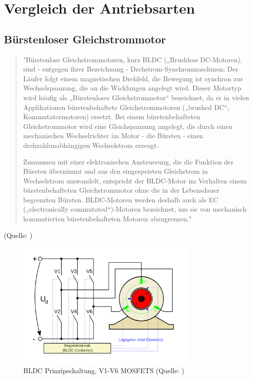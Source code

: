 \renewcommand{\autoren}{Severin Schendel	}
\newpage
\section{Vergleich der Antriebsarten}
\subsection{Bürstenloser Gleichstrommotor}

\begin{quote}
"Bürstenlose Gleichstrommotoren, kurz BLDC („Brushless DC-Motoren), sind -  entgegen ihrer Bezeichnung - Drehstrom-Synchronmaschinen: Der Läufer folgt einem magnetischen Drehfeld, die Bewegung ist synchron zur Wechselspannung, die an die Wicklungen angelegt wird. Dieser Motortyp wird häufig als „Bürstenloser Gleichstrommotor“ bezeichnet, da er in vielen Applikationen bürstenbehaftete Gleichstrommotoren („brushed DC“, Kommutatormotoren) ersetzt. Bei einem bürstenbehafteten Gleichstrommotor wird eine Gleichspannung angelegt, die durch einen mechanischen Wechselrichter im Motor - die Bürsten - einen drehzahlunabhängigen Wechselstrom erzeugt.

Zusammen mit einer elektronischen Ansteuerung, die die Funktion der Bürsten übernimmt und aus den eingespeisten Gleichstrom in Wechselstrom umwandelt, entspricht der BLDC-Motor im Verhalten einem bürstenbehafteten Gleichstrommotor ohne die in der Lebensdauer begrenzten Bürsten.  BLDC-Motoren werden deshalb auch als EC („electronically commutated“)-Motoren bezeichnet, um sie von mechanisch kommutierten bürstenbehafteten Motoren abzugrenzen."
\end{quote}
(Quelle: \cite{BLDCNanotec})
\begin{figure}[h]  %
\centering\includegraphics[width=0.8\textwidth]{images/BLDC_Prinzipschaltung}
\caption{BLDC Prinzipschaltung, V1-V6 MOSFETS \newline (Quelle: \cite{PrinzipBLDC})}
\label{PrinzipBLDC}
\end{figure}
\newpage

